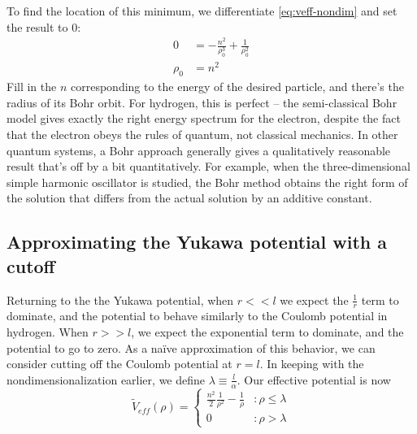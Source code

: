 \documentclass[12pt,twoside]{reedthesis}
\newcommand{\eqn}[1]{\begin{equation}#1\end{equation}}
\begin{document}
To find the location of this minimum, we differentiate \eqref{eq:veff-nondim} and set the result to $0$:
\begin{align}
0 &= -\frac{n^2}{\rho_0^3} + \frac{1}{\rho_0^2} \\
\rho_0 & = n^2
\label{eq:rho-n}
\end{align}
Fill in the $n$ corresponding to the energy of the desired particle, and there's the radius of its Bohr orbit. For hydrogen, this is perfect -- the semi-classical Bohr model gives exactly the right energy spectrum for the electron, despite the fact that the electron obeys the rules of quantum, not classical mechanics. In other quantum systems, a Bohr approach generally gives a qualitatively reasonable result that's off by a bit quantitatively. For example, when the three-dimensional simple harmonic oscillator is studied, the Bohr method obtains the right form of the solution that differs from the actual solution by an additive constant.

\subsection{Approximating the Yukawa potential with a cutoff}

Returning to the the Yukawa potential, when $r << l$ we expect the $\frac{1}{r}$ term to dominate, and the potential to behave similarly to the Coulomb potential in hydrogen. When $r >> l$, we expect the exponential term to dominate, and the potential to go to zero. As a na\"ive approximation of this behavior, we can consider cutting off the Coulomb potential at $r = l$. In keeping with the nondimensionalization earlier, we define $\lambda \equiv \frac{l}{\alpha}$. Our effective potential is now
\eqn{
\tilde{V}_{eff}(\rho) = \left\{
\begin{array}{lr}
 \frac{n^2}{2}\frac{1}{\rho^2}-\frac{1}{\rho} & : \rho \leq \lambda \\
0 & : \rho > \lambda
\end{array}
\right.
\label{eq:naive}
}
\end{document}
